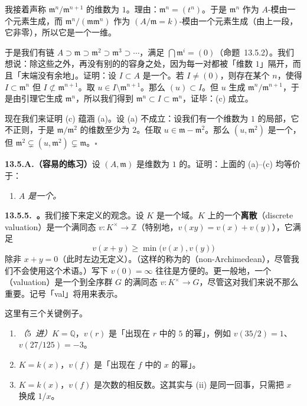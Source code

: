 我接着声称 $\mathfrak{m}^n/\mathfrak{m}^{n+1}$ 的维数为 $1$。理由：$\mathfrak{m}^n=(t^n)$。于是 $\mathfrak{m}^n$ 作为 $A$-模由一个元素生成，而 $\mathfrak{m}^n/(\mathfrak{m}\mathfrak{m}^n)$ 作为 $(A/\mathfrak{m}=k)$-模由一个元素生成（由上一段，它非零），所以它是一个一维\trVectorSpace。

于是我们有\trIdeal{}链 $A\supset\mathfrak{m}\supset\mathfrak{m}^2\supset\mathfrak{m}^3\supset\cdots$，满足 $\bigcap\mathfrak{m}^i=(0)$（命题~13.5.2）。我们想说：除这些之外，再没有别的\trIdeal{}的容身之处，因为每一对都被「维数 $1$」隔开，而且「末端没有余地」。证明：设 $I\subset A$ 是一个\trIdeal。若 $I\neq(0)$，则存在某个 $n$，使得 $I\subset\mathfrak{m}^n$ 但 $I\not\subset\mathfrak{m}^{n+1}$。取 $u\in I\setminus\mathfrak{m}^{n+1}$。那么 $(u)\subset I$。但 $u$ 生成 $\mathfrak{m}^n/\mathfrak{m}^{n+1}$，于是由\trNakayama{}引理它生成 $\mathfrak{m}^n$，所以我们得到 $\mathfrak{m}^n\subset I\subset\mathfrak{m}^n$，证毕：(c) 成立。

现在我们来证明 (c) 蕴涵 (a)。设 (a) 不成立：设我们有一个维数为 $1$ 的\trNoetherian{}局部\trIntegralDomain，它不正则，于是 $\mathfrak{m}/\mathfrak{m}^2$ 的维数至少为 $2$。任取 $u\in\mathfrak{m}-\mathfrak{m}^2$。那么 $(u,\mathfrak{m}^2)$ 是一个\trIdeal，但 $\mathfrak{m}^2\subsetneq(u,\mathfrak{m}^2)\subsetneq\mathfrak{m}$。\hfill$\square$

\textbf{13.5.A.（容易的练习）}\quad 设 $(A,\mathfrak{m})$ 是维数为 $1$ 的\trNoetherian\trLocalRing。证明：上面的 (a)--(c) 均等价于：
\begin{enumerate}[label=(\alph*),start=4]
\item \emph{$A$ 是一个\trPID。}
\end{enumerate}

\textbf{13.5.5.\ \trDVR。}\quad 我们接下来定义\trDVR{}的观念。设 $K$ 是一个域。$K$ 上的一个\textbf{离散\trValuation}（discrete valuation）是一个满同态 $v\colon K^{\times}\to\mathbb{Z}$（特别地，$v(xy)=v(x)+v(y)$），它满足
\[
v(x+y)\ge\min\bigl(v(x),v(y)\bigr)
\]
除非 $x+y=0$（此时左边无定义）。（这样的\trValuation{}称为\emph{\trNonArchimedean}的（non-Archimedean），尽管我们不会使用这个术语。）写下 $v(0)=\infty$ 往往是方便的。更一般地，一个\textbf{\trValuation}（valuation）是一个到全序\trAbelian{}群 $G$ 的满同态 $v\colon K^{\times}\to G$，尽管这对我们来说不那么重要。记号「val」将用来表示\trValuation。

这里有三个关键例子。
\begin{enumerate}[label=(\roman*)]
\item \emph{（$5$~进\trValuation）}$K=\mathbb{Q}$，$v(r)$ 是「出现在 $r$ 中的 $5$ 的幂」，例如 $v(35/2)=1$、$v(27/125)=-3$。
\item $K=k(x)$，$v(f)$ 是「出现在 $f$ 中的 $x$ 的幂」。
\item $K=k(x)$，$v(f)$ 是次数的相反数。这其实与 (ii) 是同一回事，只需把 $x$ 换成 $1/x$。
\end{enumerate}

